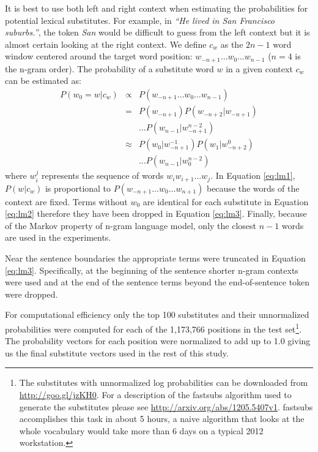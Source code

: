 It is best to use both left and right context when estimating the
probabilities for potential lexical substitutes.  For example, in
\emph{``He lived in San Francisco suburbs.''}, the token \emph{San}
would be difficult to guess from the left context but it is almost
certain looking at the right context.  We define $c_w$ as the $2n-1$
word window centered around the target word position: $w_{-n+1} \ldots
w_0 \ldots w_{n-1}$ ($n=4$ is the n-gram order).  The probability of a
substitute word $w$ in a given context $c_w$ can be estimated as:
\begin{eqnarray}
  \label{eq:lm1}P(w_0 = w | c_w) & \propto & P(w_{-n+1}\ldots w_0\ldots w_{n-1})\\
  \label{eq:lm2}& = & P(w_{-n+1})P(w_{-n+2}|w_{-n+1})\nonumber\\
  &&\ldots P(w_{n-1}|w_{-n+1}^{n-2})\\
  \label{eq:lm3}& \approx & P(w_0| w_{-n+1}^{-1})P(w_{1}|w_{-n+2}^0)\nonumber\\
  &&\ldots P(w_{n-1}|w_0^{n-2})
\end{eqnarray}
where $w_i^j$ represents the sequence of words $w_i w_{i+1} \ldots
w_{j}$.  In Equation \ref{eq:lm1}, $P(w|c_w)$ is proportional to
$P(w_{-n+1}\ldots w_0 \ldots w_{n+1})$ because the words of the
context are fixed.  Terms without $w_0$ are identical for each
substitute in Equation \ref{eq:lm2} therefore they have been dropped
in Equation \ref{eq:lm3}.  Finally, because of the Markov property of
n-gram language model, only the closest $n-1$ words are used in the
experiments.

Near the sentence boundaries the appropriate terms were truncated in
Equation \ref{eq:lm3}.  Specifically, at the beginning of the sentence
shorter n-gram contexts were used and at the end of the sentence terms
beyond the end-of-sentence token were dropped.

For computational efficiency only the top 100 substitutes and their
unnormalized probabilities were computed for each of the 1,173,766
positions in the test set\footnote{The substitutes with unnormalized
  log probabilities can be downloaded from \mbox{\url{http://goo.gl/jzKH0}}.
  For a description of the {\sc fastsubs} algorithm used to generate
  the substitutes please see \mbox{\url{http://arxiv.org/abs/1205.5407v1}}.
  {\sc fastsubs} accomplishes this task in about 5 hours, a naive
  algorithm that looks at the whole vocabulary would take more than 6
  days on a typical 2012 workstation.}.  The probability vectors for
each position were normalized to add up to 1.0 giving us the final
substitute vectors used in the rest of this study.

